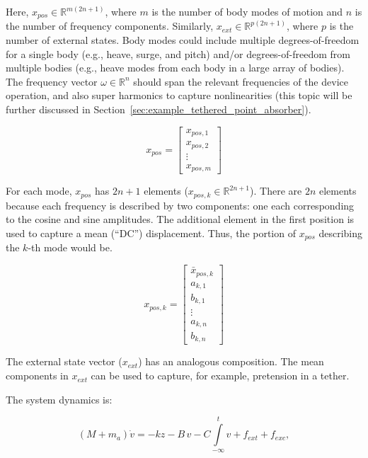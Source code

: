 \documentclass[]{article}
\begin{document}
\noindent{}Here, $x_{pos} \in \mathbb{R}^{m(2n + 1)}$, where $m$ is the number of body modes of motion and $n$ is the number of frequency components.
Similarly, $x_{ext} \in \mathbb{R}^{p(2n+1)}$, where $p$ is the number of external states.
Body modes could include multiple degrees-of-freedom for a single body (e.g., heave, surge, and pitch) and/or degrees-of-freedom from multiple bodies (e.g., heave modes from each body in a large array of bodies).
The frequency vector $\omega \in \mathbb{R}^n$ should span the relevant frequencies of the device operation, and also super harmonics to capture nonlinearities (this topic will be further discussed in Section~\ref{sec:example_tethered_point_absorber}).

\begin{equation}
	x_{pos} =
	\begin{bmatrix}
		x_{pos,1} \\
		x_{pos,2} \\
		\vdots \\
		x_{pos,m}
	\end{bmatrix}
\end{equation}

For each mode, $x_{pos}$ has $2n + 1$ elements ($x_{pos,k} \in \mathbb{R}^{2n + 1}$).
There are $2n$ elements because each frequency is described by two components: one each corresponding to the cosine and sine amplitudes.
The additional element in the first position is used to capture a mean (``DC'') displacement.
Thus, the portion of $x_{pos}$ describing the $k$-th mode would be.

\begin{equation}
	x_{pos,k} =
	\begin{bmatrix}
		\bar{x}_{pos,k} \\
		a_{k,1} \\
		b_{k,1} \\
		\vdots \\
		a_{k,n} \\
		b_{k,n}
	\end{bmatrix}
\end{equation}

\noindent{}The external state vector ($x_{ext}$) has an analogous composition.
The mean components in $x_{ext}$ can be used to capture, for example, pretension in a tether.

The system dynamics is:

\begin{equation}
	(M + m_a) \dot{v} = - k z - B \, v - C \int\limits_{-\infty}^t v  + f_{ext} + f_{exc},
\end{equation}
\end{document}
